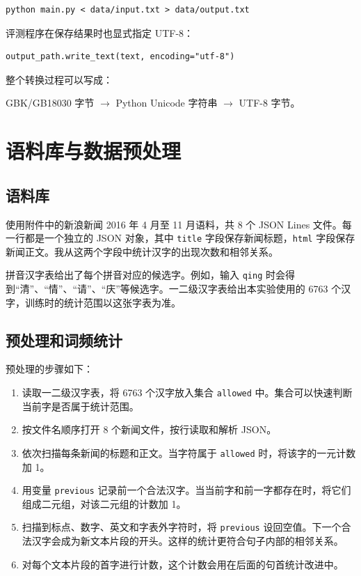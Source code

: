 \documentclass[11pt,a4paper]{ctexart}
\begin{document}
\begin{verbatim}
python main.py < data/input.txt > data/output.txt
\end{verbatim}

评测程序在保存结果时也显式指定 UTF-8：

\begin{verbatim}
output_path.write_text(text, encoding="utf-8")
\end{verbatim}

整个转换过程可以写成：

\begin{center}
GBK/GB18030 字节 $\longrightarrow$ Python Unicode 字符串
$\longrightarrow$ UTF-8 字节。
\end{center}

\section{语料库与数据预处理}

\subsection{语料库}

使用附件中的新浪新闻 2016 年 4 月至 11 月语料，共 8 个 JSON Lines 文件。每一行都是一个独立的 JSON 对象，其中 \texttt{title} 字段保存新闻标题，\texttt{html} 字段保存新闻正文。我从这两个字段中统计汉字的出现次数和相邻关系。

拼音汉字表给出了每个拼音对应的候选字。例如，输入 \texttt{qing} 时会得到“清”、“情”、“请”、“庆”等候选字。一二级汉字表给出本实验使用的 6763 个汉字，训练时的统计范围以这张字表为准。

\subsection{预处理和词频统计}

预处理的步骤如下：

\begin{enumerate}[leftmargin=2.4em]
  \item 读取一二级汉字表，将 6763 个汉字放入集合 \texttt{allowed} 中。集合可以快速判断当前字是否属于统计范围。
  \item 按文件名顺序打开 8 个新闻文件，按行读取和解析 JSON。
  \item 依次扫描每条新闻的标题和正文。当字符属于 \texttt{allowed} 时，将该字的一元计数加 1。
  \item 用变量 \texttt{previous} 记录前一个合法汉字。当当前字和前一字都存在时，将它们组成二元组，对该二元组的计数加 1。
  \item 扫描到标点、数字、英文和字表外字符时，将 \texttt{previous} 设回空值。下一个合法汉字会成为新文本片段的开头。这样的统计更符合句子内部的相邻关系。
  \item 对每个文本片段的首字进行计数，这个计数会用在后面的句首统计改进中。
\end{enumerate}
\end{document}
